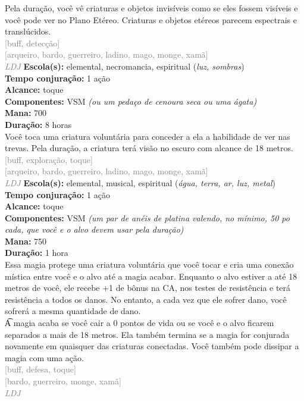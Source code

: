 \documentclass{RPG_Adventure}[2021/10/20]
\begin{document}
{\normalsize Pela duração, você vê criaturas e objetos invisíveis como se eles fossem visíveis e você pode ver no Plano Etéreo. Criaturas e objetos etéreos parecem espectrais e translúcidos.\\}
{\scriptsize \textcolor{gray}{[buff, detecção]\\}}
{\scriptsize \textcolor{gray}{[arqueiro, bardo, guerreiro, ladino, mago, monge, xamã]\\}}
{\tiny \textcolor{gray}{\textit{LDJ}}}\jump{}
{\small \t \textbf{Escola(s):} elemental, necromancia, espiritual (\textit{luz, sombras})\\\t \textbf{Tempo conjuração:} 1 ação\\\t \textbf{Alcance:} toque\\\t \textbf{Componentes:} VSM \textit{(ou um pedaço de cenoura seca ou uma ágata)}\\\t \textbf{Mana:} 700\\\t \textbf{Duração:} 8 horas\\}
{\normalsize Você toca uma criatura voluntária para conceder a ela a habilidade de ver nas trevas. Pela duração, a criatura terá visão no escuro com alcance de 18 metros.\\}
{\scriptsize \textcolor{gray}{[buff, exploração, toque]\\}}
{\scriptsize \textcolor{gray}{[arqueiro, bardo, guerreiro, ladino, mago, monge, xamã]\\}}
{\tiny \textcolor{gray}{\textit{LDJ}}}\jump{}
{\small \t \textbf{Escola(s):} elemental, musical, espiritual (\textit{água, terra, ar, luz, metal})\\\t \textbf{Tempo conjuração:} 1 ação\\\t \textbf{Alcance:} toque\\\t \textbf{Componentes:} VSM \textit{(um par de anéis de platina valendo, no mínimo, 50 po cada, que você e o alvo devem usar pela duração)}\\\t \textbf{Mana:} 750\\\t \textbf{Duração:} 1 hora\\}
{\normalsize Essa magia protege uma criatura voluntária que você tocar e cria uma conexão mística entre você e o alvo até a magia acabar. Enquanto o alvo estiver a até 18 metros de você, ele recebe +1 de bônus na CA, nos testes de resistência e terá resistência a todos os danos. No entanto, a cada vez que ele sofrer dano, você sofrerá a mesma quantidade de dano.\\\t A magia acaba se você cair a 0 pontos de vida ou se você e o alvo ficarem separados a mais de 18 metros. Ela também termina se a magia for conjurada novamente em quaisquer das criaturas conectadas. Você também pode dissipar a magia com uma ação.\\}
{\scriptsize \textcolor{gray}{[buff, defesa, toque]\\}}
{\scriptsize \textcolor{gray}{[bardo, guerreiro, monge, xamã]\\}}
{\tiny \textcolor{gray}{\textit{LDJ}}}\jump

\end{document}
